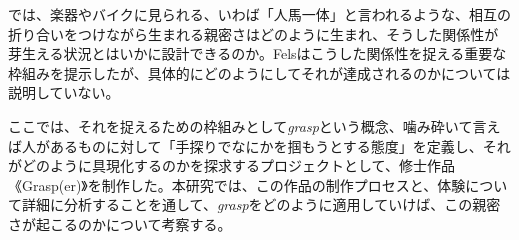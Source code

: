 では、楽器やバイクに見られる、いわば「人馬一体」と言われるような、相互の折り合いをつけながら生まれる親密さはどのように生まれ、そうした関係性が芽生える状況とはいかに設計できるのか。Felsはこうした関係性を捉える重要な枠組みを提示したが、具体的にどのようにしてそれが達成されるのかについては説明していない。

ここでは、それを捉えるための枠組みとして\textit{grasp}という概念、噛み砕いて言えば人があるものに対して「手探りでなにかを掴もうとする態度」を定義し、それがどのように具現化するのかを探求するプロジェクトとして、修士作品《Grasp(er)》を制作した。本研究では、この作品の制作プロセスと、体験について詳細に分析することを通して、\textit{grasp}をどのように適用していけば、この親密さが起こるのかについて考察する。




